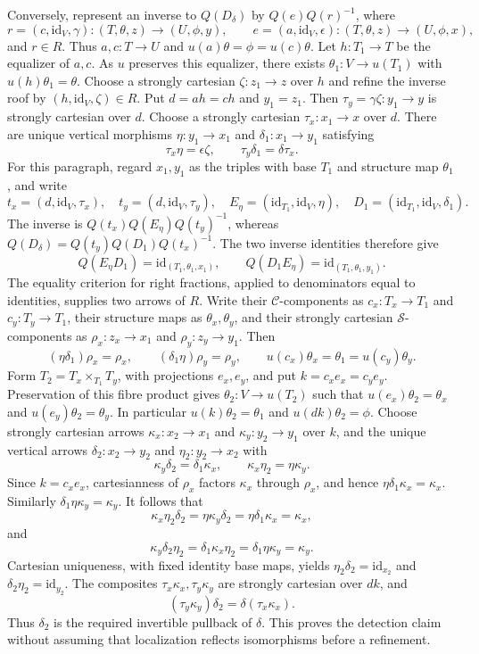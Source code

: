 \medskip\noindent
Conversely, represent an inverse to $Q(D_\delta)$ by $Q(e)Q(r)^{-1}$, where
$$
r = (c,\text{id}_V,\gamma) : (T,\theta,z) \to (U,\phi,y),\qquad
e = (a,\text{id}_V,\epsilon) : (T,\theta,z) \to (U,\phi,x),
$$
and $r \in R$. Thus $a,c : T \to U$ and
$u(a)\theta = \phi = u(c)\theta$.
Let $h : T_1 \to T$ be the equalizer of $a,c$.
As $u$ preserves this equalizer, there exists
$\theta_1 : V \to u(T_1)$ with $u(h)\theta_1 = \theta$.
Choose a strongly cartesian $\zeta : z_1 \to z$ over $h$ and refine
the inverse roof by $(h,\text{id}_V,\zeta) \in R$.
Put $d = ah = ch$ and $y_1 = z_1$.
Then $\tau_y = \gamma\zeta : y_1 \to y$ is strongly cartesian over $d$.
Choose a strongly cartesian $\tau_x : x_1 \to x$ over $d$.
There are unique vertical morphisms
$\eta : y_1 \to x_1$ and $\delta_1 : x_1 \to y_1$ satisfying
$$
\tau_x\eta = \epsilon\zeta,\qquad
\tau_y\delta_1 = \delta\tau_x.
$$
For this paragraph, regard $x_1,y_1$ as the triples with base $T_1$
and structure map $\theta_1$, and write
$$
t_x = (d,\text{id}_V,\tau_x),\quad
t_y = (d,\text{id}_V,\tau_y),\quad
E_\eta = (\text{id}_{T_1},\text{id}_V,\eta),\quad
D_1 = (\text{id}_{T_1},\text{id}_V,\delta_1).
$$
The inverse is $Q(t_x)Q(E_\eta)Q(t_y)^{-1}$, whereas
$Q(D_\delta) = Q(t_y)Q(D_1)Q(t_x)^{-1}$.
The two inverse identities therefore give
$$
Q(E_\eta D_1) = \text{id}_{(T_1,\theta_1,x_1)},\qquad
Q(D_1 E_\eta) = \text{id}_{(T_1,\theta_1,y_1)}.
$$
The equality criterion for right fractions, applied to denominators
equal to identities, supplies two arrows of $R$. Write their
$\mathcal{C}$-components as $c_x : T_x \to T_1$ and
$c_y : T_y \to T_1$, their structure maps as $\theta_x,\theta_y$, and
their strongly cartesian $\mathcal{S}$-components as
$\rho_x : z_x \to x_1$ and $\rho_y : z_y \to y_1$.
Then
$$
(\eta\delta_1)\rho_x = \rho_x,\qquad
(\delta_1\eta)\rho_y = \rho_y,\qquad
u(c_x)\theta_x = \theta_1 = u(c_y)\theta_y.
$$
Form $T_2 = T_x \times_{T_1} T_y$, with projections $e_x,e_y$, and put
$k = c_xe_x = c_ye_y$. Preservation of this fibre product gives
$\theta_2 : V \to u(T_2)$ such that
$u(e_x)\theta_2 = \theta_x$ and $u(e_y)\theta_2 = \theta_y$.
In particular $u(k)\theta_2 = \theta_1$ and $u(dk)\theta_2 = \phi$.
Choose strongly cartesian arrows $\kappa_x : x_2 \to x_1$ and
$\kappa_y : y_2 \to y_1$ over $k$, and the unique vertical arrows
$\delta_2 : x_2 \to y_2$ and $\eta_2 : y_2 \to x_2$ with
$$
\kappa_y\delta_2 = \delta_1\kappa_x,\qquad
\kappa_x\eta_2 = \eta\kappa_y.
$$
Since $k = c_xe_x$, cartesianness of $\rho_x$ factors $\kappa_x$
through $\rho_x$, and hence $\eta\delta_1\kappa_x = \kappa_x$.
Similarly $\delta_1\eta\kappa_y = \kappa_y$.
It follows that
$$
\kappa_x\eta_2\delta_2
= \eta\kappa_y\delta_2
= \eta\delta_1\kappa_x
= \kappa_x,
$$
and
$$
\kappa_y\delta_2\eta_2
= \delta_1\kappa_x\eta_2
= \delta_1\eta\kappa_y
= \kappa_y.
$$
Cartesian uniqueness, with fixed identity base maps, yields
$\eta_2\delta_2 = \text{id}_{x_2}$ and
$\delta_2\eta_2 = \text{id}_{y_2}$.
The composites $\tau_x\kappa_x,\tau_y\kappa_y$ are strongly cartesian
over $dk$, and
$$
(\tau_y\kappa_y)\delta_2 = \delta(\tau_x\kappa_x).
$$
Thus $\delta_2$ is the required invertible pullback of $\delta$.
This proves the detection claim without assuming that localization
reflects isomorphisms before a refinement.

